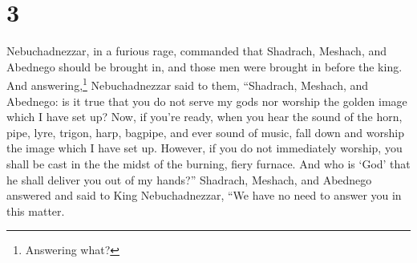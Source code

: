 \section{3}
\begin{enumerate}[align=center]
     Nebuchadnezzar, in a furious rage, commanded that Shadrach, Meshach, and Abednego should be brought in, and those men were brought in before the king.%
     And answering,\footnote{Answering what?} Nebuchadnezzar said to them, ``Shadrach, Meshach, and Abednego: is it true that you do not serve my gods nor worship the golden image which I have set up?%
     Now, if you're ready, when you hear the sound of the horn, pipe, lyre, trigon, harp, bagpipe, and ever sound of music, fall down and worship the image which I have set up. However, if you do not immediately worship, you shall be cast in the the midst of the burning, fiery furnace. And who is `God' that he shall deliver you out of my hands?''%
     Shadrach, Meshach, and Abednego answered and said to King Nebuchadnezzar, ``We have no need to answer you in this matter.%
\end{enumerate}
